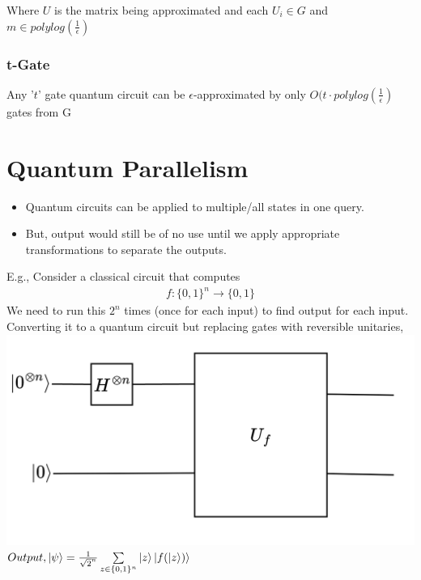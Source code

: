 \documentclass{article}
\begin{document}
Where $U$ is the matrix being approximated and each $U_{i} \in G$ and $m \in {polylog(\frac{1}{\epsilon})}$

\subsubsection{t-Gate}
Any '$t$' gate quantum circuit can be $\epsilon$-approximated by only $O(t \cdot polylog(\frac{1}{\epsilon})$ gates from G

\section{Quantum Parallelism}
\begin{itemize}
    \item Quantum circuits can be applied to multiple/all states in one query.
    \item But, output would still be of no use until we apply appropriate transformations to separate the outputs.
\end{itemize} 

E.g., Consider a classical circuit that computes 
\begin{align*}
    f: \{0, 1\}^{n} \rightarrow \{0, 1\}
\end{align*}
We need to run this $2^{n}$ times (once for each input) to find output for each input.
\medskip
Converting it to a quantum circuit but replacing gates with reversible unitaries,
\includegraphics[scale=0.5]{q5.png}
$Output, \ket{\psi} = \frac{1}{\sqrt{2}^{n}} \sum \limits _{z \in \{0, 1\}^{n}} \ket{z} \ket{f(\ket{z})} $

\end{document}

